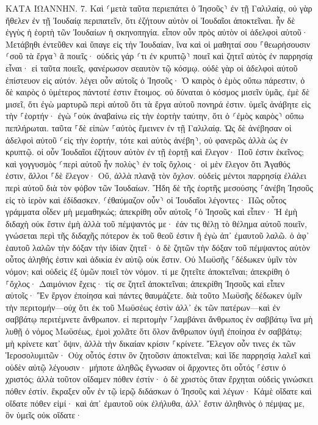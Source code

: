 \documentclass[twoside, 9pt]{extreport}
\begin{document}
ΚΑΤΑ ΙΩΑΝΝΗΝ.
7.
Καὶ ⸂μετὰ ταῦτα περιεπάτει ὁ Ἰησοῦς⸃ ἐν τῇ Γαλιλαίᾳ, οὐ γὰρ ἤθελεν ἐν τῇ Ἰουδαίᾳ περιπατεῖν, ὅτι ἐζήτουν αὐτὸν οἱ Ἰουδαῖοι ἀποκτεῖναι. 
ἦν δὲ ἐγγὺς ἡ ἑορτὴ τῶν Ἰουδαίων ἡ σκηνοπηγία. 
εἶπον οὖν πρὸς αὐτὸν οἱ ἀδελφοὶ αὐτοῦ· Μετάβηθι ἐντεῦθεν καὶ ὕπαγε εἰς τὴν Ἰουδαίαν, ἵνα καὶ οἱ μαθηταί σου ⸀θεωρήσουσιν ⸂σοῦ τὰ ἔργα⸃ ἃ ποιεῖς· 
οὐδεὶς γάρ ⸂τι ἐν κρυπτῷ⸃ ποιεῖ καὶ ζητεῖ αὐτὸς ἐν παρρησίᾳ εἶναι· εἰ ταῦτα ποιεῖς, φανέρωσον σεαυτὸν τῷ κόσμῳ. 
οὐδὲ γὰρ οἱ ἀδελφοὶ αὐτοῦ ἐπίστευον εἰς αὐτόν. 
λέγει οὖν αὐτοῖς ὁ Ἰησοῦς· Ὁ καιρὸς ὁ ἐμὸς οὔπω πάρεστιν, ὁ δὲ καιρὸς ὁ ὑμέτερος πάντοτέ ἐστιν ἕτοιμος. 
οὐ δύναται ὁ κόσμος μισεῖν ὑμᾶς, ἐμὲ δὲ μισεῖ, ὅτι ἐγὼ μαρτυρῶ περὶ αὐτοῦ ὅτι τὰ ἔργα αὐτοῦ πονηρά ἐστιν. 
ὑμεῖς ἀνάβητε εἰς τὴν ⸀ἑορτήν· ἐγὼ ⸀οὐκ ἀναβαίνω εἰς τὴν ἑορτὴν ταύτην, ὅτι ὁ ⸂ἐμὸς καιρὸς⸃ οὔπω πεπλήρωται. 
ταῦτα ⸀δὲ εἰπὼν ⸀αὐτὸς ἔμεινεν ἐν τῇ Γαλιλαίᾳ. 
Ὡς δὲ ἀνέβησαν οἱ ἀδελφοὶ αὐτοῦ ⸂εἰς τὴν ἑορτήν, τότε καὶ αὐτὸς ἀνέβη⸃, οὐ φανερῶς ἀλλὰ ὡς ἐν κρυπτῷ. 
οἱ οὖν Ἰουδαῖοι ἐζήτουν αὐτὸν ἐν τῇ ἑορτῇ καὶ ἔλεγον· Ποῦ ἐστιν ἐκεῖνος; 
καὶ γογγυσμὸς ⸂περὶ αὐτοῦ ἦν πολὺς⸃ ἐν τοῖς ὄχλοις· οἱ μὲν ἔλεγον ὅτι Ἀγαθός ἐστιν, ἄλλοι ⸀δὲ ἔλεγον· Οὔ, ἀλλὰ πλανᾷ τὸν ὄχλον. 
οὐδεὶς μέντοι παρρησίᾳ ἐλάλει περὶ αὐτοῦ διὰ τὸν φόβον τῶν Ἰουδαίων. 
Ἤδη δὲ τῆς ἑορτῆς μεσούσης ⸀ἀνέβη Ἰησοῦς εἰς τὸ ἱερὸν καὶ ἐδίδασκεν. 
⸂ἐθαύμαζον οὖν⸃ οἱ Ἰουδαῖοι λέγοντες· Πῶς οὗτος γράμματα οἶδεν μὴ μεμαθηκώς; 
ἀπεκρίθη οὖν αὐτοῖς ⸀ὁ Ἰησοῦς καὶ εἶπεν· Ἡ ἐμὴ διδαχὴ οὐκ ἔστιν ἐμὴ ἀλλὰ τοῦ πέμψαντός με· 
ἐάν τις θέλῃ τὸ θέλημα αὐτοῦ ποιεῖν, γνώσεται περὶ τῆς διδαχῆς πότερον ἐκ τοῦ θεοῦ ἐστιν ἢ ἐγὼ ἀπ᾽ ἐμαυτοῦ λαλῶ. 
ὁ ἀφ᾽ ἑαυτοῦ λαλῶν τὴν δόξαν τὴν ἰδίαν ζητεῖ· ὁ δὲ ζητῶν τὴν δόξαν τοῦ πέμψαντος αὐτὸν οὗτος ἀληθής ἐστιν καὶ ἀδικία ἐν αὐτῷ οὐκ ἔστιν. 
Οὐ Μωϋσῆς ⸀δέδωκεν ὑμῖν τὸν νόμον; καὶ οὐδεὶς ἐξ ὑμῶν ποιεῖ τὸν νόμον. τί με ζητεῖτε ἀποκτεῖναι; 
ἀπεκρίθη ὁ ⸀ὄχλος· Δαιμόνιον ἔχεις· τίς σε ζητεῖ ἀποκτεῖναι; 
ἀπεκρίθη Ἰησοῦς καὶ εἶπεν αὐτοῖς· Ἓν ἔργον ἐποίησα καὶ πάντες θαυμάζετε. 
διὰ τοῦτο Μωϋσῆς δέδωκεν ὑμῖν τὴν περιτομήν—οὐχ ὅτι ἐκ τοῦ Μωϋσέως ἐστὶν ἀλλ᾽ ἐκ τῶν πατέρων—καὶ ἐν σαββάτῳ περιτέμνετε ἄνθρωπον. 
εἰ περιτομὴν ⸀λαμβάνει ἄνθρωπος ἐν σαββάτῳ ἵνα μὴ λυθῇ ὁ νόμος Μωϋσέως, ἐμοὶ χολᾶτε ὅτι ὅλον ἄνθρωπον ὑγιῆ ἐποίησα ἐν σαββάτῳ; 
μὴ κρίνετε κατ᾽ ὄψιν, ἀλλὰ τὴν δικαίαν κρίσιν ⸀κρίνετε. 
Ἔλεγον οὖν τινες ἐκ τῶν Ἱεροσολυμιτῶν· Οὐχ οὗτός ἐστιν ὃν ζητοῦσιν ἀποκτεῖναι; 
καὶ ἴδε παρρησίᾳ λαλεῖ καὶ οὐδὲν αὐτῷ λέγουσιν· μήποτε ἀληθῶς ἔγνωσαν οἱ ἄρχοντες ὅτι οὗτός ⸀ἐστιν ὁ χριστός; 
ἀλλὰ τοῦτον οἴδαμεν πόθεν ἐστίν· ὁ δὲ χριστὸς ὅταν ἔρχηται οὐδεὶς γινώσκει πόθεν ἐστίν. 
ἔκραξεν οὖν ἐν τῷ ἱερῷ διδάσκων ὁ Ἰησοῦς καὶ λέγων· Κἀμὲ οἴδατε καὶ οἴδατε πόθεν εἰμί· καὶ ἀπ᾽ ἐμαυτοῦ οὐκ ἐλήλυθα, ἀλλ᾽ ἔστιν ἀληθινὸς ὁ πέμψας με, ὃν ὑμεῖς οὐκ οἴδατε· 
\end{document}
